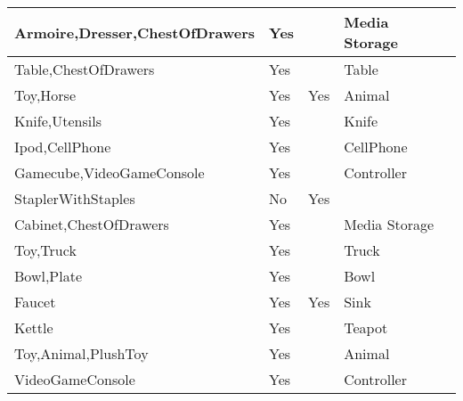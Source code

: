 \documentclass{article}
\begin{document}
\begin{longtable}{|l|l|l|l|l|}
Armoire,Dresser,ChestOfDrawers           & Yes              &                                & Media Storage  &                             \\ \hline
Table,ChestOfDrawers                     & Yes              &                                & Table          &                             \\ \hline
Toy,Horse                                & Yes              & Yes                            & Animal         &                             \\ \hline
Knife,Utensils                           & Yes              &                                & Knife          &                             \\ \hline
Ipod,CellPhone                           & Yes              &                                & CellPhone      &                             \\ \hline
Gamecube,VideoGameConsole                & Yes              &                                & Controller     &                             \\ \hline
StaplerWithStaples                       & No               & Yes                            &                &                             \\ \hline
Cabinet,ChestOfDrawers                   & Yes              &                                & Media Storage  &                             \\ \hline
Toy,Truck                                & Yes              &                                & Truck          &                             \\ \hline
Bowl,Plate                               & Yes              &                                & Bowl           &                             \\ \hline
Faucet                                   & Yes              & Yes                            & Sink           &                             \\ \hline
Kettle                                   & Yes              &                                & Teapot         &                             \\ \hline
Toy,Animal,PlushToy                      & Yes              &                                & Animal         &                             \\ \hline
VideoGameConsole                         & Yes              &                                & Controller     &                             \\ \hline

\end{longtable}
\end{document}
